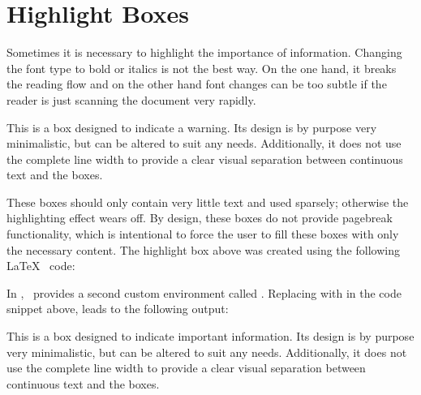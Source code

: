 \section{Highlight Boxes}
	Sometimes it is necessary to highlight the importance of information. 
	Changing the font type to bold or italics is not the best way. On the 
	one hand, it breaks the reading flow and on the other hand font changes 
	can be too subtle if the reader is just scanning the document very 
	rapidly.
	\begin{daWarningBox}
		This is a box designed to indicate a warning. Its design is by 
		purpose very minimalistic, but can be altered to suit any needs. 
		Additionally, it does not use the complete line width to provide a 
		clear visual separation between continuous text and the boxes.
	\end{daWarningBox}
	These boxes should only contain very little text and used sparsely; 
	otherwise the highlighting effect wears off. By design, these boxes do 
	not provide pagebreak functionality, which is intentional to force the 
	user to fill these boxes with only the necessary content.
	\newline The highlight box above was created using the following \LaTeX~
	code:
	\lstset{style=LaTeX}
	
	In \productVersion, \productName~provides a second custom environment 
	called . Replacing  with  in the code snippet 
	above, leads to the following output:
	\begin{daInfoBox}
		This is a box designed to indicate important information. Its design
		is by purpose very minimalistic, but can be altered to suit any 
		needs. Additionally, it does not use the complete line width to 
		provide a clear visual separation between \mbox{continuous} text 
		and the boxes.
	\end{daInfoBox}
